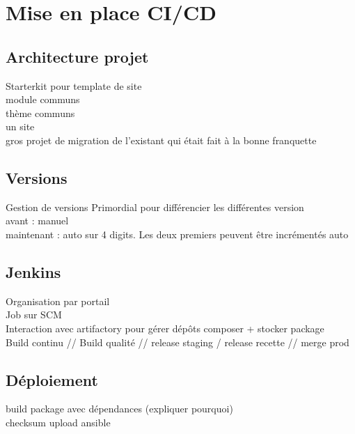 \section{Mise en place CI/CD}
\subsection[Architecture]{Architecture projet}
\begin{frame}{\subsecname}
	Starterkit pour template de site
	 \\
	 module communs
	 \\
	 thème communs
	 \\
	 un site 
	 \\ gros projet de migration de l'existant qui était fait à la bonne franquette
\end{frame}

\subsection{Versions}
\begin{frame}{Gestion de versions}
	Primordial pour différencier les différentes version \\
	avant : manuel \\
	maintenant : auto sur 4 digits. Les deux premiers peuvent être incrémentés auto
\end{frame}

\subsection{Jenkins}
\begin{frame}{\subsecname}
	Organisation par portail \\ 
	Job sur SCM \\
	Interaction avec artifactory pour gérer dépôts composer + stocker package \\
	Build continu // Build qualité // release staging / release recette // merge prod
\end{frame}

\subsection{Déploiement}
\begin{frame}{\subsecname}
	build package avec dépendances (expliquer pourquoi)\\
	checksum
	upload
	ansible
\end{frame}

